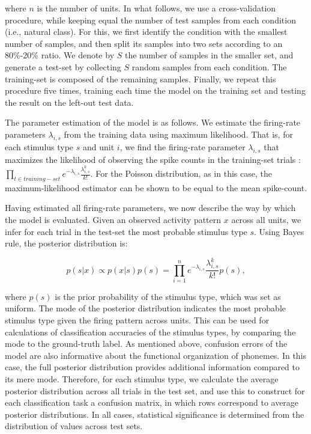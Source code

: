 where $n$ is the number of units. In what follows, we use a cross-validation procedure, while keeping equal the number of test samples from each condition (i.e., natural class). For this, we first identify the condition with the smallest number of samples, and then split its samples into two sets according to an 80\%-20\% ratio. We denote by $S$ the number of samples in the smaller set, and generate a test-set by collecting $S$ random samples from each condition. The training-set is composed of the remaining samples. Finally, we repeat this procedure five times, training each time the model on the training set and testing the result on the left-out test data.

The parameter estimation of the model is as follows. We estimate the firing-rate parameters $\lambda_{i,s}$ from the training data using maximum likelihood. That is, for each stimulus type $s$ and unit $i$, we find the firing-rate parameter $\lambda_{i,s}$ that maximizes the likelihood of observing the spike counts in the training-set trials :$\prod_{t \in training-set}{e^{-\lambda_{i,s}}\frac{\lambda_{i,s}^k}{k!}}$. For the Poisson distribution, as in this case, the maximum-likelihood estimator can be shown to be equal to the mean spike-count.
 
Having estimated all firing-rate parameters, we now describe the way by which the model is evaluated. Given an observed activity pattern $x$ across all units, we infer for each trial in the test-set the most probable stimulus type $s$. Using Bayes rule, the posterior distribution is: 

\begin{equation}
    p(s|x) \propto p(x|s)p(s) = \prod_{i=1}^n{e^{-\lambda_{i,s}}\frac{\lambda_{i,s}^k}{k!}p(s)}, 
\end{equation}

where $p(s)$ is the prior probability of the stimulus type, which was set as uniform. The mode of the posterior distribution indicates the most probable stimulus type given the firing pattern across units. This can be used for calculations of classification accuracies of the stimulus types, by comparing the mode to the ground-truth label. As mentioned above, confusion errors of the model are also informative about the functional organization of phonemes. In this case, the full posterior distribution provides additional information compared to its mere mode. Therefore, for each stimulus type, we calculate the average posterior distribution across all trials in the test set, and use this to construct for each classification task a confusion matrix, in which rows correspond to average posterior distributions. In all cases, statistical significance is determined from the distribution of values across test sets.

